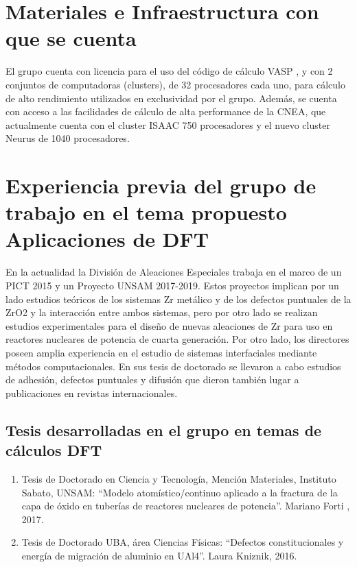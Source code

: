 \section{ Materiales e Infraestructura con que se cuenta }

El grupo cuenta con licencia para el uso del código de cálculo VASP\cite{Hafner2007,
Hafner2008} , y con 
2 conjuntos de computadoras (clusters), de 32 procesadores cada uno, para 
cálculo de alto rendimiento utilizados en exclusividad por el grupo. Además, se 
cuenta con acceso a las facilidades de cálculo de alta performance de la CNEA, 
que actualmente cuenta con el cluster ISAAC 750 procesadores y el nuevo cluster 
Neurus de 1040 procesadores.

\section{Experiencia previa del grupo de trabajo en el tema propuesto Aplicaciones 
de DFT}

En la actualidad la División de Aleaciones Especiales trabaja en el marco de un 
PICT 2015 y un Proyecto UNSAM 2017-2019. Estos proyectos implican por un lado 
estudios teóricos de los sistemas Zr metálico y de los defectos puntuales de la 
ZrO2 y la interacción entre ambos sistemas, pero por otro lado se realizan 
estudios experimentales para el diseño de nuevas aleaciones de Zr para uso en 
reactores nucleares de potencia de cuarta generación. 
Por otro lado, los directores poseen amplia experiencia en el estudio de 
sistemas interfaciales mediante métodos computacionales. En sus tesis de 
doctorado se llevaron a cabo estudios de adhesión, defectos puntuales y 
difusión que dieron también lugar a publicaciones en revistas internacionales. 

\subsection{ Tesis desarrolladas en el grupo en temas de cálculos DFT}

\begin{enumerate}


\item Tesis de Doctorado en Ciencia y Tecnología, Mención Materiales, 
Instituto Sabato, UNSAM: “Modelo atomístico/continuo aplicado a la fractura de 
la capa de óxido en tuberías de reactores nucleares de potencia”. Mariano Forti 
, 2017.

\item Tesis de Doctorado UBA, área Ciencias Físicas: “Defectos 
constitucionales y energía de migración de aluminio en UAl4”. Laura Kniznik, 
2016. 

\end{enumerate}

